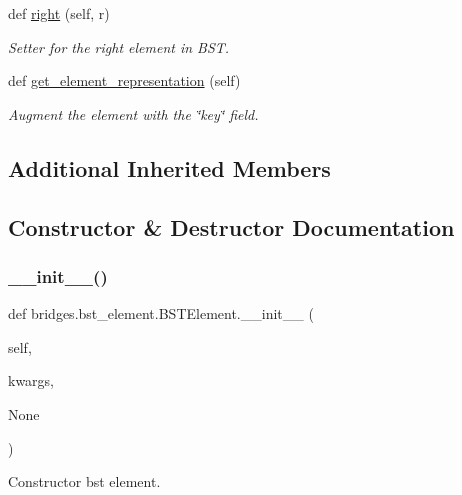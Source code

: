 \begin{DoxyCompactItemize}
def \mbox{\hyperlink{classbridges_1_1bst__element_1_1_b_s_t_element_a978ae0db366dee59703ed266eebca0e9}{right}} (self, r)
\begin{DoxyCompactList}\small\item\em Setter for the right element in B\+ST. \end{DoxyCompactList}\item 
def \mbox{\hyperlink{classbridges_1_1bst__element_1_1_b_s_t_element_a5f49ae18e50343ed63a83baa2c42e192}{get\+\_\+element\+\_\+representation}} (self)
\begin{DoxyCompactList}\small\item\em Augment the element with the \char`\"{}key\char`\"{} field. \end{DoxyCompactList}\end{DoxyCompactItemize}
\subsection*{Additional Inherited Members}


\subsection{Constructor \& Destructor Documentation}
\mbox{\label{classbridges_1_1bst__element_1_1_b_s_t_element_ab5f7e1266a3e1777472702f5a3f595c5}} 
\subsubsection{\texorpdfstring{\+\_\+\+\_\+init\+\_\+\+\_\+()}{\_\_init\_\_()}}
{\footnotesize\ttfamily def bridges.\+bst\+\_\+element.\+B\+S\+T\+Element.\+\_\+\+\_\+init\+\_\+\+\_\+ (\begin{DoxyParamCaption}\item[{}]{self,  }\item[{}]{kwargs,  }\item[{}]{None }\end{DoxyParamCaption})}



Constructor bst element. 

